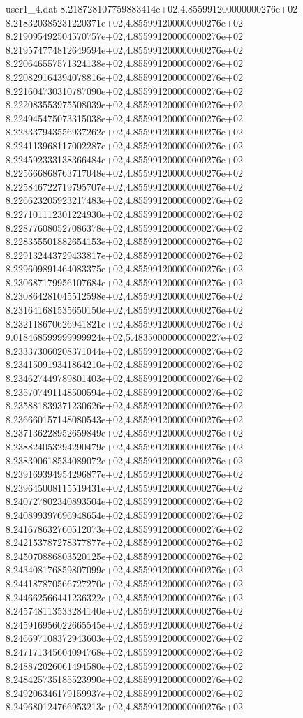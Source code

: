 \begin{filecontents}{user1_4.dat}
8.218728107759883414e+02,4.855991200000000276e+02
8.218320385231220371e+02,4.855991200000000276e+02
8.219095492504570757e+02,4.855991200000000276e+02
8.219574774812649594e+02,4.855991200000000276e+02
8.220646557571324138e+02,4.855991200000000276e+02
8.220829164394078816e+02,4.855991200000000276e+02
8.221604730310787090e+02,4.855991200000000276e+02
8.222083553975508039e+02,4.855991200000000276e+02
8.224945475073315038e+02,4.855991200000000276e+02
8.223337943556937262e+02,4.855991200000000276e+02
8.224113968117002287e+02,4.855991200000000276e+02
8.224592333138366484e+02,4.855991200000000276e+02
8.225666868763717048e+02,4.855991200000000276e+02
8.225846722719795707e+02,4.855991200000000276e+02
8.226623205923217483e+02,4.855991200000000276e+02
8.227101112301224930e+02,4.855991200000000276e+02
8.228776080527086378e+02,4.855991200000000276e+02
8.228355501882654153e+02,4.855991200000000276e+02
8.229132443729433817e+02,4.855991200000000276e+02
8.229609891464083375e+02,4.855991200000000276e+02
8.230687179956107684e+02,4.855991200000000276e+02
8.230864281045512598e+02,4.855991200000000276e+02
8.231641681535650150e+02,4.855991200000000276e+02
8.232118670626941821e+02,4.855991200000000276e+02
9.018468599999999924e+02,5.483500000000000227e+02
8.233373060208371044e+02,4.855991200000000276e+02
8.234150919341864210e+02,4.855991200000000276e+02
8.234627449789801403e+02,4.855991200000000276e+02
8.235707491148500594e+02,4.855991200000000276e+02
8.235881839371230626e+02,4.855991200000000276e+02
8.236660157148080543e+02,4.855991200000000276e+02
8.237136228952659849e+02,4.855991200000000276e+02
8.238824053294290479e+02,4.855991200000000276e+02
8.238390618534089072e+02,4.855991200000000276e+02
8.239169394954296877e+02,4.855991200000000276e+02
8.239645008115519431e+02,4.855991200000000276e+02
8.240727802340893504e+02,4.855991200000000276e+02
8.240899397696948654e+02,4.855991200000000276e+02
8.241678632760512073e+02,4.855991200000000276e+02
8.242153787278377877e+02,4.855991200000000276e+02
8.245070886803520125e+02,4.855991200000000276e+02
8.243408176859807099e+02,4.855991200000000276e+02
8.244187870566727270e+02,4.855991200000000276e+02
8.244662566441236322e+02,4.855991200000000276e+02
8.245748113533284140e+02,4.855991200000000276e+02
8.245916956022665545e+02,4.855991200000000276e+02
8.246697108372943603e+02,4.855991200000000276e+02
8.247171345604094768e+02,4.855991200000000276e+02
8.248872026061494580e+02,4.855991200000000276e+02
8.248425735185523990e+02,4.855991200000000276e+02
8.249206346179159937e+02,4.855991200000000276e+02
8.249680124766953213e+02,4.855991200000000276e+02

\end{filecontents}
